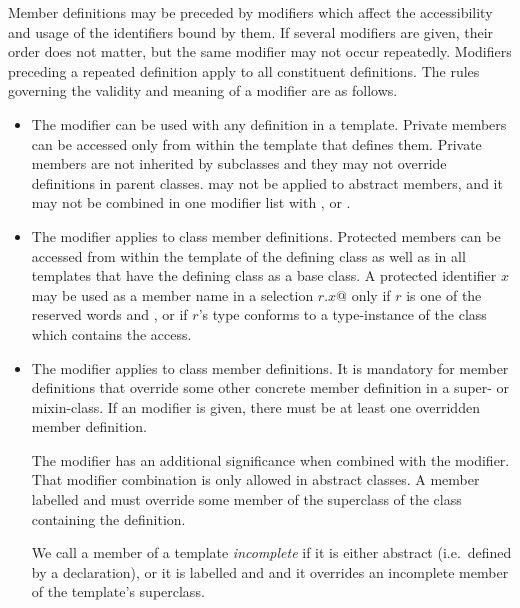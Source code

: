 \documentclass[a4paper,12pt,twoside,titlepage]{book}
\newcommand{\ifqualified}[1]{}
\begin{document}
Member definitions may be preceded by modifiers which affect the
\ifqualified{qualified names, }accessibility and usage of the
identifiers bound by them.  If several modifiers are given, their
order does not matter, but the same modifier may not occur repeatedly.
Modifiers preceding a repeated definition apply to all constituent
definitions.  The rules governing the validity and meaning of a
modifier are as follows.
\begin{itemize}
\item
The  modifier can be used with any definition in a
template. Private members can be accessed only from within the template
that defines them.  
Private members are not inherited by subclasses and they
may not override definitions in parent classes.
 may not be applied to abstract members, and it
may not be combined in one modifier list with
,  or .
\item
The  modifier applies to class member definitions.
Protected members can be accessed from within the template of the defining
class as well as in all templates that have the defining class as a base class.
A protected identifier $x$ may be used as
a member name in a selection \lstinline@$r$.$x$@ only if $r$ is one of the reserved
words  and
, or if $r$'s type conforms to a type-instance of the class
which contains the access.
\item
The  modifier applies to class member definitions.  It
is mandatory for member definitions that override some other concrete
member definition in a super- or mixin-class. If an 
modifier is given, there must be at least one overridden member
definition.  

The  modifier has an additional significance when
combined with the  modifier.  That modifier combination
is only allowed in abstract classes.  A member
labelled  and  must override some
member of the superclass of the class containing the definition.

We call a member of a template {\em incomplete} if it is either
abstract (i.e.\ defined by a declaration), or it is labelled
 and  and it overrides an incomplete
member of the template's superclass.


\end{itemize}
\end{document}
